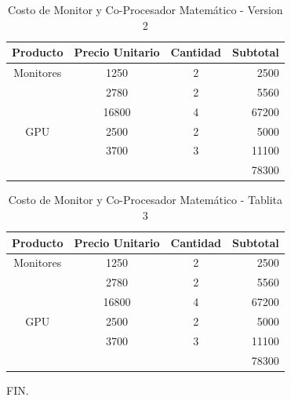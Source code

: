 \documentclass[]{article}
\begin{document}
\begin{table}[h]
	\centering
	\begin{tabular}{cccr}
		\hline
		Producto & Precio Unitario & Cantidad & Subtotal \\
		\hline
		Monitores & 1250 & 2 & 2500\\
		& 2780 & 2 & 5560 \\
		& 16800 & 4 & 67200 \\
		\hline
		GPU	 	  & 2500 & 2 & 5000\\
		& 3700 & 3 & 11100\\
		\cline{4-4}
		&      &   & 78300
	\end{tabular}
	\caption{Costo de Monitor y Co-Procesador Matemático - Version 2}
	\label{table:2}
\end{table}

\lipsum[11-14]
\begin{table}[h]
	\centering
	\begin{tabular}{cccr}
		\hline
		Producto & Precio Unitario & Cantidad & Subtotal \\
		\hline
		Monitores & 1250 & 2 & 2500\\
		& 2780 & 2 & 5560 \\
		& 16800 & 4 & 67200 \\
		\hline
		GPU	 	  & 2500 & 2 & 5000\\
		& 3700 & 3 & 11100\\
		\cline{4-4}
		&      &   & 78300
	\end{tabular}
	\caption{Costo de Monitor y Co-Procesador Matemático - Tablita 3}
	\label{table:3}
\end{table}

FIN.
\newpage
\listoftables
\listoffigures
\tableofcontents
\end{document}
